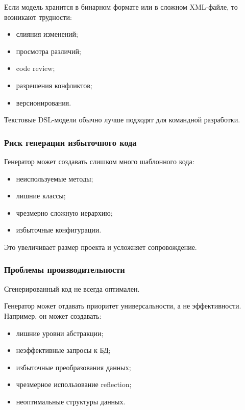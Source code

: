 \documentclass[12pt,a4paper]{article}
\begin{document}
Если модель хранится в бинарном формате или в сложном XML-файле, то возникают трудности:

\begin{itemize}
    \item слияния изменений;
    \item просмотра различий;
    \item code review;
    \item разрешения конфликтов;
    \item версионирования.
\end{itemize}

Текстовые DSL-модели обычно лучше подходят для командной разработки.

\subsubsection{Риск генерации избыточного кода}

Генератор может создавать слишком много шаблонного кода:

\begin{itemize}
    \item неиспользуемые методы;
    \item лишние классы;
    \item чрезмерно сложную иерархию;
    \item избыточные конфигурации.
\end{itemize}

Это увеличивает размер проекта и усложняет сопровождение.

\subsubsection{Проблемы производительности}

Сгенерированный код не всегда оптимален.

Генератор может отдавать приоритет универсальности, а не эффективности. Например, он может создавать:

\begin{itemize}
    \item лишние уровни абстракции;
    \item неэффективные запросы к БД;
    \item избыточные преобразования данных;
    \item чрезмерное использование reflection;
    \item неоптимальные структуры данных.
\end{itemize}
\end{document}
